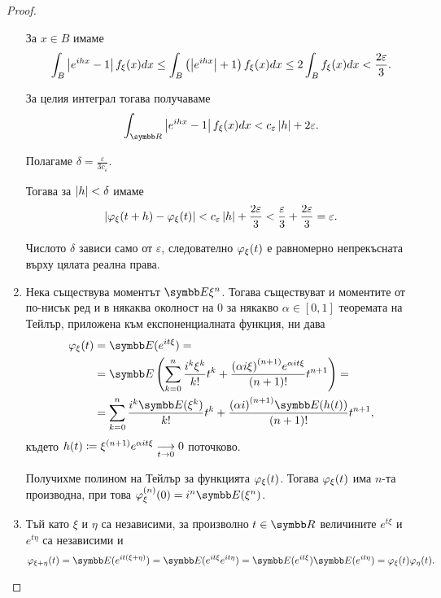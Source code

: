 \documentclass[
  headings=standardclasses,
  bibliography=totocnumbered,
]{scrartcl}
\begin{document}
\begin{proof}
\begin{enumerate}
    За \( x \in B \) имаме
    \begin{equation*}
      \int_B \Abs{e^{ihx} - 1} f_\xi(x) dx
      \leq
      \int_B \left( \Abs{e^{ihx}} + 1 \right) f_\xi(x) dx
      \leq
      2 \int_B f_\xi(x) dx
      <
      \frac {2\varepsilon} 3.
    \end{equation*}

    За целия интеграл тогава получаваме
    \begin{equation*}
      \int_{\R} \Abs{e^{ihx} - 1} f_\xi(x) dx
      <
      c_\varepsilon \Abs{h} + 2 \varepsilon.
    \end{equation*}

    Полагаме \( \delta = \frac \varepsilon {3 c_\varepsilon} \).

    Тогава за \( \Abs h < \delta \) имаме
    \begin{equation*}
      \Abs{\Char_\xi(t + h) - \Char_\xi(t)}
      <
      c_\varepsilon \Abs{h} + \frac {2\varepsilon} 3
      <
      \frac {\varepsilon} 3 + \frac {2\varepsilon} 3
      =
      \varepsilon.
    \end{equation*}

    Числото \( \delta \) зависи само от \( \varepsilon \), следователно \( \Char_\xi(t) \) е равномерно непрекъсната върху цялата реална права.

    \item Нека съществува моментът \( \Expect \xi^n \). Тогава съществуват и моментите от по-нисък ред и в някаква околност на \( 0 \) за някакво \( \alpha \in [0, 1] \) теоремата на Тейлър, приложена към експоненциалната функция, ни дава
    \begin{align*}
      \Char_\xi(t)
      &=
      \Expect(e^{it\xi})
      = \\ &=
      \Expect\left(\sum_{k=0}^n \frac {i^k \xi^k} {k!} t^k + \frac {{(\alpha i \xi)}^{(n+1)} e^{\alpha it \xi}} {(n+1)!} t^{n+1} \right)
      = \\ &=
      \sum_{k=0}^n \frac {i^k \Expect(\xi^k)} {k!} t^k + \frac {{(\alpha i)}^{(n+1)} \Expect(h(t))} {(n+1)!} t^{n+1},
    \end{align*}
    където \( h(t) \coloneqq \xi^{(n+1)} e^{\alpha it \xi} \Conv[t \to 0]{} 0 \) поточково.

    Получихме полином на Тейлър за функцията \( \Char_\xi(t) \). Тогава \( \Char_\xi(t) \) има \( n \)-та производна, при това \( \Char^{(n)}_\xi(0) = i^n \Expect(\xi^n) \).

    \item Тъй като \( \xi \) и \( \eta \) са независими, за произволно \( t \in \R \) величините \( e^{t\xi} \) и \( e^{t\eta} \) са независими и
    \begin{equation*}
      \Char_{\xi + \eta}(t)
      =
      \Expect(e^{it(\xi + \eta)})
      =
      \Expect(e^{it\xi} e^{it\eta})
      =
      \Expect(e^{it\xi}) \Expect(e^{it\eta})
      =
      \Char_\xi(t) \Char_\eta(t).
    \end{equation*}


\end{enumerate}
\end{proof}
\end{document}
